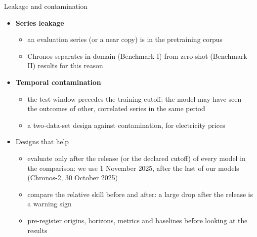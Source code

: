 \begin{frame}{Leakage and contamination}
\itemsize{\small}
\begin{itemize}
    \item \textbf{Series leakage}
    \begin{itemize}
        \item an evaluation series (or a near copy) is in the pretraining corpus
        \item Chronos separates in-domain (Benchmark I) from zero-shot (Benchmark II) results for this reason 
    \end{itemize}
    \item \textbf{Temporal contamination}
    \begin{itemize}
        \item the test window precedes the training cutoff: the model may have seen the outcomes of other, correlated series in the same period
        \item a two-data-set design against contamination, for electricity prices 
    \end{itemize}
    \item Designs that help
    \begin{itemize}
        \item evaluate only after the release (or the declared cutoff) of every model in the comparison; we use 1 November 2025, after the last of our models (Chronos-2, 30 October 2025)
        \item compare the relative skill before and after: a large drop after the release is a warning sign
        \item pre-register origins, horizons, metrics and baselines before looking at the results
    \end{itemize}
\end{itemize}
\end{frame}


